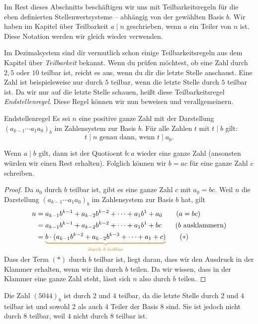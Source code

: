 \documentclass[../../main.tex]{subfiles}
\begin{document}
Im Rest dieses Abschnitts beschäftigen wir uns mit Teilbarkeitsregeln für die eben definierten Stellenwertsysteme -- abhängig von der gewählten Basis $b$. Wir haben im Kapitel über Teilbarkeit $a\mid n$ geschrieben, wenn $a$ ein Teiler von $n$ ist. Diese Notation werden wir gleich wieder verwenden.

Im Dezimalsystem sind dir vermutlich schon einige Teilbarkeitsregeln aus dem Kapitel über \mayberef\emph{Teilbarkeit} bekannt. Wenn du prüfen möchtest, ob eine Zahl durch $2, 5$ oder $10$ teilbar ist, reicht es aus, wenn du dir die letzte Stelle anschaust. Eine Zahl ist beispielsweise nur durch $5$ teilbar, wenn die letzte Stelle durch $5$ teilbar ist. Da wir nur auf die letzte Stelle schauen, heißt diese Teilbarkeitsregel \emph{Endstellenregel}. Diese Regel können wir nun beweisen und verallgemeinern.
\begin{theorem}{Endstellenregel}
    Es sei $n$ eine positive ganze Zahl mit der Darstellung $(a_{k-1}\cdots a_1a_0)_b$ im Zahlensystem zur Basis $b$. Für alle Zahlen $t$ mit $t\mid b$ gilt:
    \[t\mid n\text{ genau dann, wenn }t\mid a_0.\]
\end{theorem}
Wenn $a\mid b$ gilt, dann ist der Quotioent $b:a$ wieder eine ganze Zahl (ansonsten würden wir einen Rest erhalten). Folglich können wir $b=ac$ für eine ganze Zahl $c$ schreiben. 
\begin{proof}
    Da $a_0$ durch $b$ teilbar ist, gibt es eine ganze Zahl $c$ mit $a_0=bc$. Weil $n$ die Darstellung $(a_{k-1}\cdots a_1a_0)_b$ im Zahlensystem zur Basis $b$ hat, gilt
    \begin{align*}
        n&=a_{k-1}b^{k-1}+a_{k-2}b^{k-2}+\dots+a_1b^1+a_0\tag{$a=bc$}\\
        &=a_{k-1}b^{k-1}+a_{k-2}b^{k-2}+\dots+a_1b^1+bc\tag{$b$ ausklammern}\\
        &=\colorbrace{b\cdot(a_{k-1}b^{k-2}+a_{k-2}b^{k-3}+\dots+a_1+c)}{\text{durch }b\text{ teilbar}}\tag{$*$}
    \end{align*}
    Dass der Term $(*)$ durch $b$ teilbar ist, liegt daran, dass wir den Ausdruck in der Klammer erhalten, wenn wir ihn durch $b$ teilen. Da wir wissen, dass in der Klammer eine ganze Zahl steht, lässt sich $n$ also durch $b$ teilen.
\end{proof}
\begin{example}{}
    Die Zahl $(5044)_8$ ist durch $2$ und $4$ teilbar, da die letzte Stelle durch $2$ und $4$ teilbar ist und sowohl $2$ als auch $4$ Teiler der Basis $8$ sind. Sie ist jedoch nicht durch $8$ teilbar, weil $4$ nicht durch $8$ teilbar ist.
\end{example}
\end{document}
